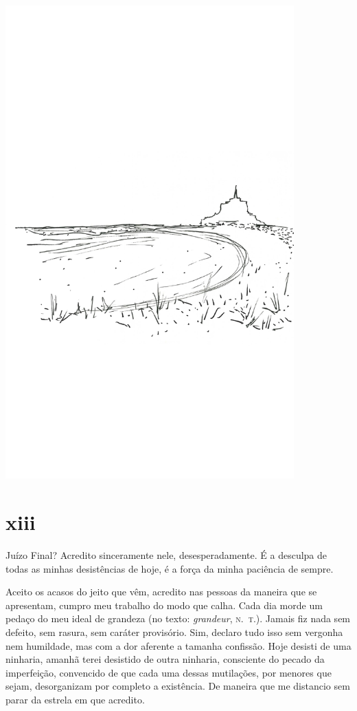 \pagebreak
\thispagestyle{empty}

\begin{center}
\vspace*{-2cm}
\hspace*{-1.35cm}\includegraphics[width=111mm]{./imgs/praia.jpg}
\end{center}

\pagebreak

\section{xiii}

Juízo Final? Acredito sinceramente nele, desesperadamente. É a desculpa
de todas as minhas desistências de hoje, é a força da minha paciência de
sempre.

Aceito os acasos do jeito que vêm, acredito nas pessoas da maneira que
se apresentam, cumpro meu trabalho do modo que calha. Cada dia morde um
pedaço do meu ideal de grandeza (no texto: \emph{grandeur}, \textsc{n.~t.}).
Jamais fiz nada sem defeito, sem rasura, sem caráter provisório. Sim,
declaro tudo isso sem vergonha nem humildade, mas com a dor aferente a
tamanha confissão. Hoje desisti de uma ninharia, amanhã terei desistido
de outra ninharia, consciente do pecado da imperfeição, convencido de
que cada uma dessas mutilações, por menores que sejam, desorganizam por
completo a existência. De maneira que me distancio sem parar da estrela
em que acredito.

